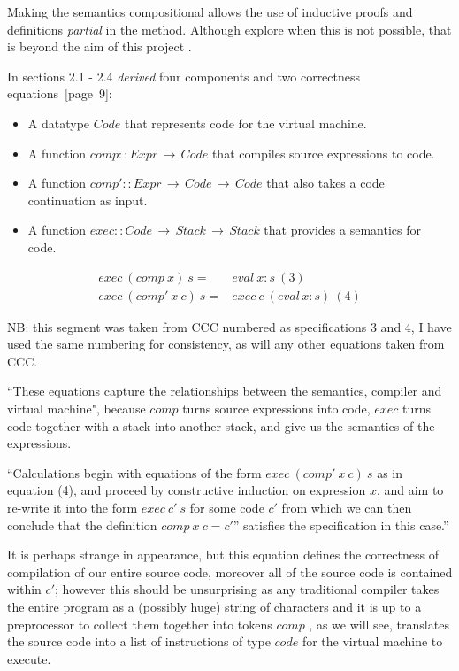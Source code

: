 \documentclass {article}
\begin{document}
Making the semantics compositional allows
the use of inductive proofs and definitions \emph{partial}
in the \BH method.
Although \BH explore
when this is not possible, that is beyond
the aim of this project \cite{bandh}.

In sections 2.1 - 2.4 \BH
\emph{derived} four 
components and two correctness equations\cite{bandh}~[page~9]:

\begin{itemize}
	\item A datatype $Code$ that represents
		code for the virtual machine.
	\item A function \( comp::Expr \, \rightarrow \, Code \)
		that compiles source expressions to code.
	\item A function 
		\( comp'::Expr \, \rightarrow \, Code \, \rightarrow \, Code \)
		that also takes a code continuation as input.
	\item A function
		\( exec::Code \, \rightarrow \, Stack \, \rightarrow \, Stack \)
		that provides a semantics for code.
\end{itemize}

\begin{eqnarray*}
	exec \  (comp \  x) \  s =& eval \  x:s \ (3) \\
	exec \  (comp' \  x \  c) \ s =& exec \  c \  (eval \, x:s) \ (4)
\end{eqnarray*}

\newcommand{\exec}{$exec$ }
\newcommand{\comp}{$comp$ }
\newcommand{\compp}{$comp'$ }

NB: this segment was taken from CCC
numbered as specifications 3 and 4,
I have used the same numbering for consistency,
as will any other equations taken
from CCC.

``These equations capture the relationships between
the semantics, compiler and virtual machine"\cite[page 9]{bandh},
because \comp turns source expressions into code,
\exec turns code together with a stack into another stack,
and \eval give us the semantics of the expressions.

``Calculations begin with equations
of the form $exec \  (comp' \  x \  c) \  s$
as in equation (4),
and proceed by constructive induction on 
expression $x$, 
and aim to re-write it into the form
$exec \  c' \  s$ for some code $c'$
from which we can then conclude that the definition
$comp \  x \  c = c'$'' satisfies the 
specification in this case.''\cite{bandh}

It is perhaps strange in appearance,
but this equation
defines the correctness of compilation of our entire source code,
moreover all of the source code is contained within $c'$;
however this should be unsurprising as any traditional compiler
takes the entire program as a (possibly huge) string of characters
and it is up to a preprocessor to collect them together into tokens \cite{dragon}
\comp, as we will see, translates the source code into a
list of instructions of type $code$ for the virtual machine to execute.
\end{document}
